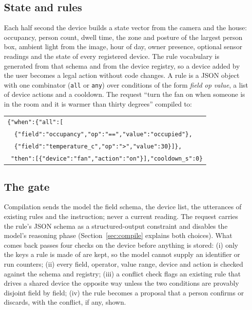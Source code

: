 \documentclass[conference]{IEEEtran}
\begin{document}
\subsection{State and rules}
Each half second the device builds a state vector from the camera and the
house: occupancy, person count, dwell time, the zone and posture of the largest
person box, ambient light from the image, hour of day, owner presence, optional
sensor readings and the state of every registered device. The rule vocabulary
is generated from that schema and from the device registry, so a device added
by the user becomes a legal action without code changes. A rule is a JSON
object with one combinator (\texttt{all} or \texttt{any}) over conditions of the
form \textit{field op value}, a list of device actions and a cooldown. The
request ``turn the fan on when someone is in the room and it is warmer than
thirty degrees'' compiled to:
\begin{center}\scriptsize
\begin{tabular}{@{}l@{}}
\texttt{\{"when":\{"all":[}\\
\texttt{\ \ \{"field":"occupancy","op":"==","value":"occupied"\},}\\
\texttt{\ \ \{"field":"temperature\_c","op":">","value":30\}]\},}\\
\texttt{\ "then":[\{"device":"fan","action":"on"\}],"cooldown\_s":0\}}
\end{tabular}
\end{center}

\subsection{The gate}
Compilation sends the model the field schema, the device list, the utterances
of existing rules and the instruction; never a current reading. The request
carries the rule's JSON schema as a structured-output constraint and disables
the model's reasoning phase (Section~\ref{sec:compile} explains both choices).
What comes back passes four checks on the device before anything is stored:
(i) only the keys a rule is made of are kept, so the model cannot supply an
identifier or run counters; (ii) every field, operator, value range, device and
action is checked against the schema and registry; (iii) a conflict check flags
an existing rule that drives a shared device the opposite way unless the two
conditions are provably disjoint field by field; (iv) the rule becomes a
proposal that a person confirms or discards, with the conflict, if any, shown.
\end{document}
